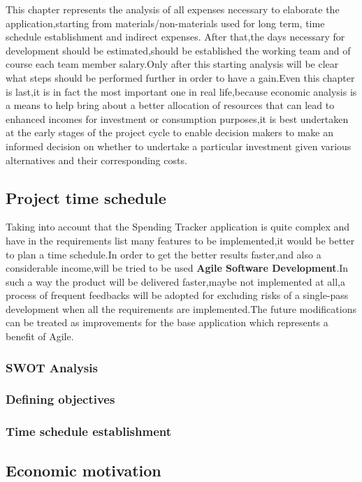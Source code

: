 This chapter represents the analysis of all expenses necessary to elaborate the application,starting from  materials/non-materials used for long term, time schedule establishment and indirect expenses. After that,the days necessary for development should be estimated,should be established the working team and of course each team member salary.Only after this starting analysis will be clear what steps should be performed further in order to have a gain.Even this chapter is last,it is in fact the most important one in real life,because economic analysis is a means to help bring about a better allocation of resources that can lead to enhanced incomes for investment or consumption purposes,it is best undertaken at the early stages of the project cycle to enable decision makers to make an informed decision on whether to undertake a particular investment given various alternatives and their corresponding costs.

\newpage
\subsection{Project time schedule}
Taking into account that the Spending Tracker application is quite complex and have in the requirements list many features to be implemented,it would be better to plan a time schedule.In order to get the better results faster,and also a considerable income,will be tried to be used \textbf{Agile Software Development}.In such a way the product will be delivered faster,maybe not implemented at all,a process of frequent feedbacks will be adopted for excluding risks of a single-pass development when all the requirements are implemented.The future modifications can be treated as improvements for the base application which represents a benefit of Agile.
\subsubsection{SWOT Analysis}
\subsubsection{Defining objectives}
\subsubsection{Time schedule establishment}
\subsection{Economic motivation}
